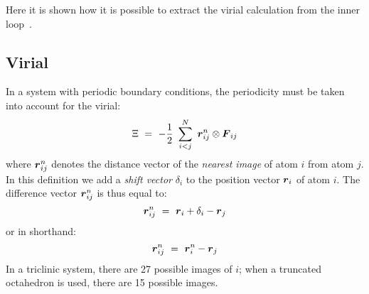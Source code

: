 Here it is shown how it is possible to extract the virial calculation
from the inner loop~\cite{Bekker93b}.

\subsection{Virial}
In a system with periodic boundary conditions, the
periodicity must be taken into account for the virial:
\begin{equation}
\Xi~=~-\half~\sum_{i < j}^{N}~\rnij\otimes\Fvij
\end{equation}
where $\rnij$ denotes the distance vector of the
{\em nearest image} of atom $i$ from atom $j$. In this definition we add
a {\em shift vector} $\delta_i$ to the position vector $\rvi$ 
of atom $i$. The difference vector $\rnij$ is thus equal to:
\begin{equation}
\rnij~=~\rvi+\delta_i-\rvj
\end{equation}
or in shorthand:
\begin{equation}
\rnij~=~\rni-\rvj
\end{equation}
In a triclinic system, there are 27 possible images of $i$; when a truncated 
octahedron is used, there are 15 possible images.

